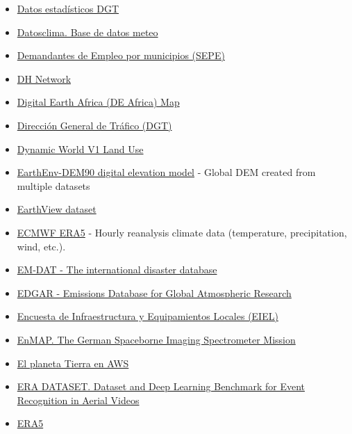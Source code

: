 \documentclass[
  letterpaper,
  DIV=11,
  numbers=noendperiod]{scrartcl}
\begin{document}
\begin{itemize}
{  de uso en H2O). 120G}
\item
  \href{https://sedeapl.dgt.gob.es/WEB_IEST_CONSULTA/}{Datos
  estadísticos DGT}
\item
  \href{http://datosclima.es/Aemet2013/DescargaDatos.html}{Datosclima.
  Base de datos meteo}
\item
  \href{https://datos.gob.es/es/catalogo/ea0041513-demandantes-de-empleo-por-municipio}{Demandantes
  de Empleo por municipios (SEPE)}
\item
  \href{http://opendhn.dhnetwork.opendata.arcgis.com/}{DH Network}
\item
  \href{https://www.digitalearthafrica.org/platform-resources/platform}{Digital
  Earth Africa (DE Africa) Map}
\item
  \href{https://sedeapl.dgt.gob.es/WEB_IEST_CONSULTA/inicio.faces}{Dirección
  General de Tráfico (DGT)}
\item
  \href{https://developers.google.com/earth-engine/datasets/catalog/GOOGLE_DYNAMICWORLD_V1}{Dynamic
  World V1 Land Use}
\item
  \href{https://www.earthenv.org/DEM}{EarthEnv-DEM90 digital elevation
  model} - Global DEM created from multiple datasets
\item
  \href{https://huggingface.co/datasets/satellogic/EarthView}{EarthView
  dataset}
\item
  \href{https://www.ecmwf.int/en/forecasts/dataset/ecmwf-reanalysis-v5}{ECMWF
  ERA5} - Hourly reanalysis climate data (temperature, precipitation,
  wind, etc.).
\item
  \href{https://www.emdat.be/}{EM-DAT - The international disaster
  database}
\item
  \href{https://edgar.jrc.ec.europa.eu/emissions_data_and_maps}{EDGAR -
  Emissions Database for Global Atmospheric Research}
\item
  \href{https://mptmd.gob.es/portal/politica-territorial/local/coop_econom_local_estado_fondos_europeos/eiel}{Encuesta
  de Infraestructura y Equipamientos Locales (EIEL)}
\item
  \href{https://www.enmap.org/}{EnMAP. The German Spaceborne Imaging
  Spectrometer Mission}
\item
  \href{https://aws.amazon.com/es/earth/}{El planeta Tierra en AWS}
\item
  \href{https://lcmou.github.io/ERA_Dataset/}{ERA DATASET. Dataset and
  Deep Learning Benchmark for Event Recognition in Aerial Videos}
\item
  \href{https://developers.google.com/earth-engine/datasets/catalog/ECMWF_ERA5_DAILY}{ERA5
}
\end{itemize}
\end{document}
